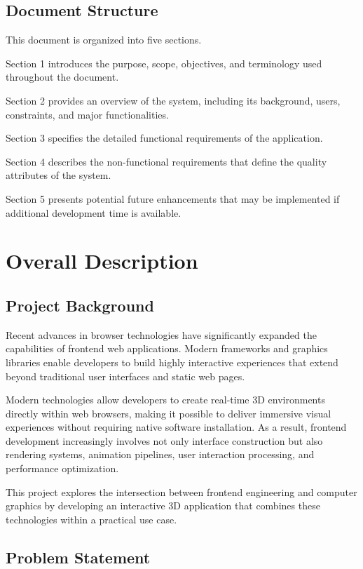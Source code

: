 \documentclass[11pt,a4paper]{article}
\begin{document}
\subsection{Document Structure}

This document is organized into five sections.

Section 1 introduces the purpose, scope, objectives, and terminology used
throughout the document.

Section 2 provides an overview of the system, including its background, users,
constraints, and major functionalities.

Section 3 specifies the detailed functional requirements of the application.

Section 4 describes the non-functional requirements that define the quality
attributes of the system.

Section 5 presents potential future enhancements that may be implemented if
additional development time is available.

\section{Overall Description}

\subsection{Project Background}

Recent advances in browser technologies have significantly expanded the
capabilities of frontend web applications. Modern frameworks and graphics
libraries enable developers to build highly interactive experiences that extend
beyond traditional user interfaces and static web pages.

Modern technologies allow developers to create real-time 3D environments
directly within web browsers, making it possible to deliver immersive visual
experiences without requiring native software installation. As a result,
frontend development increasingly involves not only interface construction but
also rendering systems, animation pipelines, user interaction processing, and
performance optimization.

This project explores the intersection between frontend engineering and
computer graphics by developing an interactive 3D application that combines
these technologies within a practical use case.

\subsection{Problem Statement}
\end{document}

